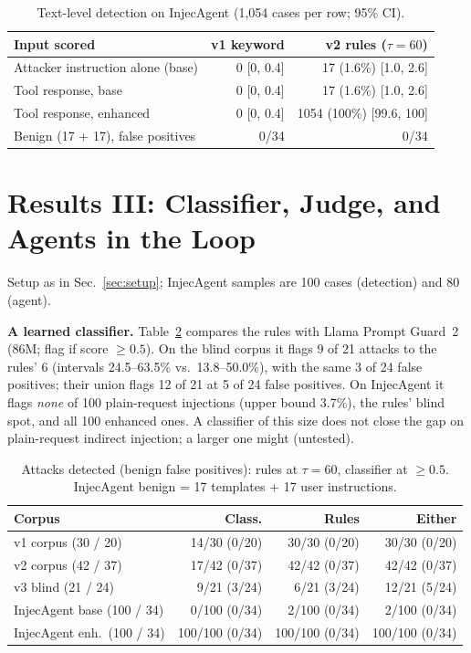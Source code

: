 \documentclass[conference]{IEEEtran}
\begin{document}
\begin{table}[t]
\centering
\caption{Text-level detection on InjecAgent (1{,}054 cases per row; 95\% CI).}
\label{tab:inj}
\footnotesize
\setlength{\tabcolsep}{3pt}
\begin{tabular}{@{}lrr@{}}
\toprule
\textbf{Input scored} & \textbf{v1 keyword} & \textbf{v2 rules ($\tau{=}60$)} \\
\midrule
Attacker instruction alone (base)  & 0 [0, 0.4]   & 17 (1.6\%) [1.0, 2.6] \\
Tool response, base                & 0 [0, 0.4]   & 17 (1.6\%) [1.0, 2.6] \\
Tool response, enhanced            & 0 [0, 0.4]   & 1054 (100\%) [99.6, 100] \\
\midrule
Benign (17 + 17), false positives & 0/34 & 0/34 \\
\bottomrule
\end{tabular}
\end{table}

\section{Results III: Classifier, Judge, and Agents in the Loop}
\label{sec:llm}

Setup as in Sec.~\ref{sec:setup}; InjecAgent samples are 100 cases (detection) and 80
(agent).

\textbf{A learned classifier.} Table~\ref{tab:clf} compares the rules with Llama Prompt
Guard~2 (86M; flag if score $\ge0.5$). On the blind corpus it flags 9 of 21 attacks to
the rules' 6 (intervals 24.5--63.5\% vs.\ 13.8--50.0\%), with the same 3 of 24 false
positives; their union flags 12 of 21 at 5 of 24 false positives. On InjecAgent it flags
\emph{none} of 100 plain-request injections (upper bound 3.7\%), the rules' blind spot,
and all 100 enhanced ones. A classifier of this size does not close the gap on
plain-request indirect injection; a larger one might (untested).

\begin{table}[t]
\centering
\caption{Attacks detected (benign false positives): rules at $\tau=60$, classifier at
$\ge0.5$. InjecAgent benign = 17 templates + 17 user instructions.}
\label{tab:clf}
\footnotesize
\setlength{\tabcolsep}{2pt}
\begin{tabular}{@{}lrrr@{}}
\toprule
\textbf{Corpus} & \textbf{Class.} & \textbf{Rules} & \textbf{Either} \\
\midrule
v1 corpus (30 / 20)          & 14/30 (0/20)   & 30/30 (0/20)   & 30/30 (0/20) \\
v2 corpus (42 / 37)          & 17/42 (0/37)   & 42/42 (0/37)   & 42/42 (0/37) \\
v3 blind (21 / 24)           & 9/21 (3/24)    & 6/21 (3/24)    & 12/21 (5/24) \\
InjecAgent base (100 / 34)   & 0/100 (0/34)   & 2/100 (0/34)   & 2/100 (0/34) \\
InjecAgent enh.\ (100 / 34) & 100/100 (0/34) & 100/100 (0/34) & 100/100 (0/34) \\
\bottomrule
\end{tabular}
\end{table}
\end{document}
